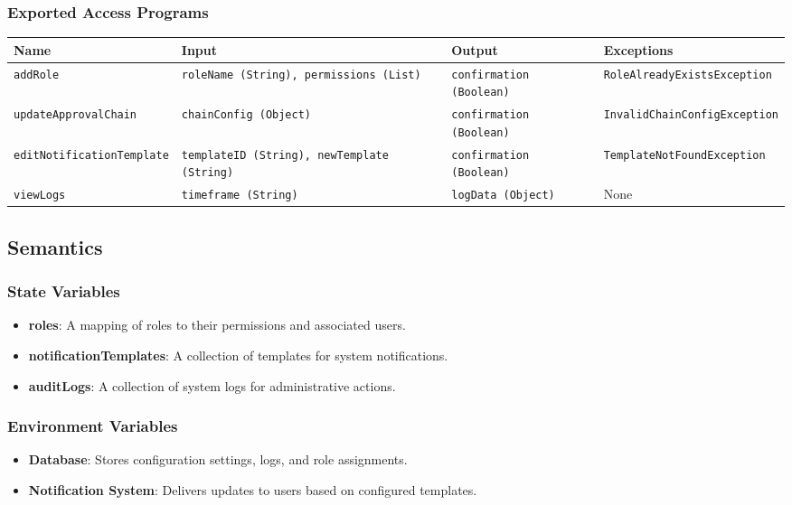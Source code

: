 \documentclass[12pt, titlepage]{article}
\begin{document}
\subsubsection{Exported Access Programs}
\begin{center}
    \begin{tabular}{|p{3cm}|p{4cm}|p{4cm}|p{4cm}|}
        \hline
        \textbf{Name} & \textbf{Input} & \textbf{Output} & \textbf{Exceptions} \\
        \hline
        \texttt{addRole} & \texttt{roleName (String), permissions (List)} & \texttt{confirmation (Boolean)} & \texttt{RoleAlreadyExistsException} \\
        \hline
        \texttt{updateApprovalChain} & \texttt{chainConfig (Object)} & \texttt{confirmation (Boolean)} & \texttt{InvalidChainConfigException} \\
        \hline
        \texttt{editNotificationTemplate} & \texttt{templateID (String), newTemplate (String)} & \texttt{confirmation (Boolean)} & \texttt{TemplateNotFoundException} \\
        \hline
        \texttt{viewLogs} & \texttt{timeframe (String)} & \texttt{logData (Object)} & None \\
        \hline
    \end{tabular}
\end{center}

\subsection{Semantics}

\subsubsection{State Variables}
\begin{itemize}
    \item \textbf{roles}: A mapping of roles to their permissions and associated users.
    \item \textbf{notificationTemplates}: A collection of templates for system notifications.
    \item \textbf{auditLogs}: A collection of system logs for administrative actions.
\end{itemize}

\subsubsection{Environment Variables}
\begin{itemize}
    \item \textbf{Database}: Stores configuration settings, logs, and role assignments.
    \item \textbf{Notification System}: Delivers updates to users based on configured templates.
\end{itemize}
\end{document}
